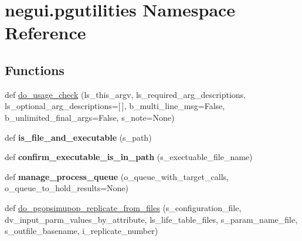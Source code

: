 \hypertarget{namespacenegui_1_1pgutilities}{}\section{negui.\+pgutilities Namespace Reference}
\label{namespacenegui_1_1pgutilities}
\subsection*{Functions}
\begin{DoxyCompactItemize}
\item 
def \hyperlink{namespacenegui_1_1pgutilities_a20a66168135d35b6713e38b2503f6289}{do\+\_\+usage\+\_\+check} (ls\+\_\+this\+\_\+argv, ls\+\_\+required\+\_\+arg\+\_\+descriptions, ls\+\_\+optional\+\_\+arg\+\_\+descriptions=\mbox{[}$\,$\mbox{]}, b\+\_\+multi\+\_\+line\+\_\+msg=False, b\+\_\+unlimited\+\_\+final\+\_\+args=False, s\+\_\+note=None)
\item 
def {\bfseries is\+\_\+file\+\_\+and\+\_\+executable} (s\+\_\+path)\hypertarget{namespacenegui_1_1pgutilities_a8a347fe70cfaae23658adb58cd312e93}{}\label{namespacenegui_1_1pgutilities_a8a347fe70cfaae23658adb58cd312e93}

\item 
def {\bfseries confirm\+\_\+executable\+\_\+is\+\_\+in\+\_\+path} (s\+\_\+exectuable\+\_\+file\+\_\+name)\hypertarget{namespacenegui_1_1pgutilities_a8fe3f14ed21663af6196c0c53349c536}{}\label{namespacenegui_1_1pgutilities_a8fe3f14ed21663af6196c0c53349c536}

\item 
def {\bfseries manage\+\_\+process\+\_\+queue} (o\+\_\+queue\+\_\+with\+\_\+target\+\_\+calls, o\+\_\+queue\+\_\+to\+\_\+hold\+\_\+results=None)\hypertarget{namespacenegui_1_1pgutilities_a2096f66a8484e74902fb97c787c79345}{}\label{namespacenegui_1_1pgutilities_a2096f66a8484e74902fb97c787c79345}

\item 
def \hyperlink{namespacenegui_1_1pgutilities_a45d0d6e76c216a5ad3f6bc46fc68a701}{do\+\_\+pgopsimupop\+\_\+replicate\+\_\+from\+\_\+files} (s\+\_\+configuration\+\_\+file, dv\+\_\+input\+\_\+parm\+\_\+values\+\_\+by\+\_\+attribute, ls\+\_\+life\+\_\+table\+\_\+files, s\+\_\+param\+\_\+name\+\_\+file, s\+\_\+outfile\+\_\+basename, i\+\_\+replicate\+\_\+number)
\end{DoxyCompactItemize}
